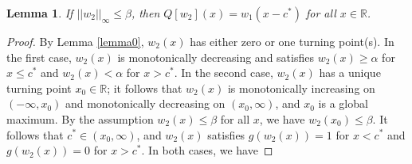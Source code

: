 \documentclass[11pt]{article}
\newtheorem{lem}[thm]{Lemma}
\theoremstyle{definition}
\numberwithin{equation}{section}
\numberwithin{thm}{section}
\renewcommand{\a}{\alpha}
\renewcommand{\b}{\beta}
\newcommand{\m}{\mu}
\begin{document}
%



\begin{lem} \label{lemma1}
If $ ||w_2||_\infty \leq \b$, then $Q[w_2](x)=w_1(x-c^*)$ for all $x\in\mathbb R$.
\end{lem}

\begin{proof}
By Lemma \ref{lemma0}, $w_2(x)$ has either zero or one turning point(s). In the first case, $w_2(x)$ is monotonically decreasing and satisfies $w_2(x) \geq \a$ for $x \leq c^*$ and $w_2(x) < \a$ for $x > c^*$. In the second case, $w_2(x)$ has a unique turning point $x_0 \in \mathbb R$; it follows that $w_2(x)$ is monotonically increasing on $(-\infty,x_0)$ and monotonically decreasing on $(x_0,\infty)$, and $x_0$ is a global maximum. By the assumption $w_2(x)\leq\beta$ for all $x$, we have $w_2(x_0)\leq\beta$. It follows that $c^* \in (x_0,\infty)$, and $w_2(x)$ satisfies $g(w_2(x))=1$ for $x<c^*$ and $g(w_2(x)) = 0$ for $x>c^*$. In both cases, we have



%


\end{proof}
\end{document}
